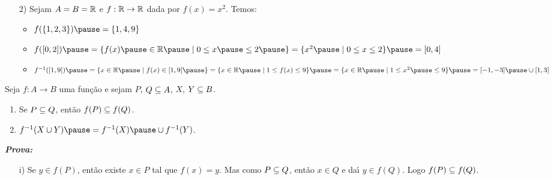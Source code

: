 \documentclass{beamer}
\begin{document}
    \begin{frame}
        \begin{exemplos}
            \begin{enumerate}
                \item[2)] Sejam $A = B = \mathbb{R}$ \pause e $f : \mathbb{R} \to \mathbb{R}$ \pause dada por $f(x) = x^2$. \pause Temos:\pause

                \vspace{.5cm}

                \begin{itemize}
                    \item $f(\{1, 2, 3\}) \pause = \{1, 4, 9\}$\pause

                    \vspace{.5cm}

                    \item $f([0,2]) \pause = \{f(x) \pause \in \real \pause \mid 0 \le x \pause \le 2 \pause \} = \{x^2 \pause \mid 0 \le x \le 2\} \pause = [0, 4]$\pause

                    \vspace{.5cm}

                    \item $f^{-1}([1, 9]) \pause = \{x \in \real \pause \mid f(x) \in [1, 9]\pause \} = \{ x \in \real \pause \mid 1 \le f(x) \le 9\} \pause = \{x \in \real \pause \mid 1 \le x^2 \pause \le 9\} \pause = [-1, -3] \pause \cup [1, 3]$\pause

                    \vspace{.5cm}
                \end{itemize}
            \end{enumerate}
        \end{exemplos}
    \end{frame}

    \begin{frame}
        \begin{proposicao}
            Seja $f : A \to B$ uma fun{\c c}{\~a}o \pause e sejam $P$, \pause $Q \subseteq A$, \pause $X$, \pause $Y \subseteq B$.\pause
            \begin{enumerate}[label={\roman*})]
                \item Se $P \subseteq Q$, \pause ent{\~a}o $f(P) \subseteq f(Q)$.\pause

                \vspace{.5cm}

                \item $f^{-1}(X \cup Y) \pause = f^{-1}(X) \pause \cup f^{-1}(Y)$.\pause
            \end{enumerate}
        \end{proposicao}
            \noindent \textbf{\textit{Prova: }}\pause
            \begin{enumerate}
                \item[i)] Se $y \in f(P)$, \pause ent{\~a}o existe $x \in P$ \pause tal que $f(x) = y$. \pause Mas como $P \subseteq Q$, \pause ent{\~a}o $x \in Q$ \pause e da{\'\i} $y \in f(Q)$. \pause Logo $f(P) \subseteq f(Q)$.\pause
            \end{enumerate}
        \end{frame}
\end{document}
